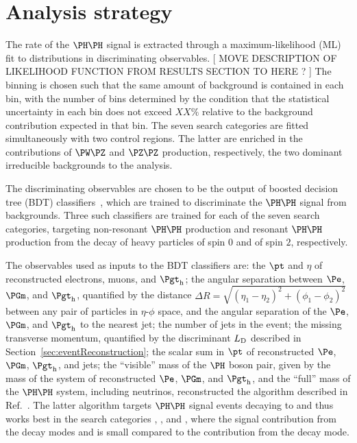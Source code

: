 \section{Analysis strategy}
\label{sec:analysisStrategy}

The rate of the $\HH$ signal is extracted through a maximum-likelihood (ML) fit to distributions in discriminating observables.
[ MOVE DESCRIPTION OF LIKELIHOOD FUNCTION FROM RESULTS SECTION TO HERE ? ]
The binning is chosen such that the same amount of background is contained in each bin,
with the number of bins determined by the condition that the statistical uncertainty in each bin does not exceed $XX\%$ relative to the background contribution expected in that bin.
The seven search categories are fitted simultaneously with two control regions.
The latter are enriched in the contributions of $\PW\PZ$ and $\PZ\PZ$ production, respectively,
the two dominant irreducible backgrounds to the analysis.

The discriminating observables are chosen to be the output of boosted decision tree (BDT) classifiers~\cite{Breiman:1984jka},
which are trained to discriminate the $\HH$ signal from backgrounds.
Three such classifiers are trained for each of the seven search categories,
targeting non-resonant $\HH$ production and resonant $\HH$ production from the decay of heavy particles of spin $0$ and of spin $2$, respectively.

The observables used as inputs to the BDT classifiers are:
the $\pt$ and $\eta$ of reconstructed electrons, muons, and $\tauh$;
the angular separation between $\Pe$, $\PGm$, and $\tauh$,
quantified by the distance $\Delta R = \sqrt{(\eta_{1} - \eta_{2})^{2} + (\phi_{1} - \phi_{2})^{2}}$ between any pair of particles in $\eta$-$\phi$ space,
and the angular separation of the $\Pe$, $\PGm$, and $\tauh$ to the nearest jet;
the number of jets in the event;
the missing transverse momentum, quantified by the discriminant $L_\mathrm{D}$ described in Section~\ref{sec:eventReconstruction};
the scalar sum in $\pt$ of reconstructed $\Pe$, $\PGm$, $\tauh$, and jets;
the ``visible'' mass of the $\PHiggs$ boson pair, given by the mass of the system of reconstructed $\Pe$, $\PGm$, and $\tauh$,
and the ``full'' mass of the $\HH$ system, including neutrinos, reconstructed the algorithm described in Ref.~\cite{Ehataht:2018nql}.
The latter algorithm targets $\HH$ signal events decaying to \tttt and thus works best in the search categories \zeroLeptonFourTau, \oneLeptonThreeTau, and \twoLeptonTwoTau,
where the signal contribution from the decay modes \WWWW and \WWtt is small compared to the contribution from the \tttt decay mode.

